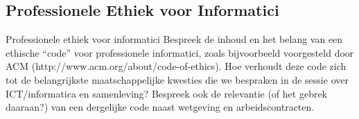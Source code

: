 \documentclass[../main.tex]{subfiles}
\begin{document}
\subsection{Professionele Ethiek voor Informatici}
\begin{question}
Professionele ethiek voor informatici
Bespreek de inhoud en het belang van een ethische ``code'' voor professionele informatici, zoals bijvoorbeeld voorgesteld door ACM (http://www.acm.org/about/code-of-ethics).
Hoe verhoudt deze code zich tot de belangrijkste maatschappelijke kwesties die we bespraken in de sessie over ICT/informatica en samenleving? Bespreek ook de relevantie (of het gebrek daaraan?) van een dergelijke code naast wetgeving en arbeidscontracten.
\end{question}
\end{document}

